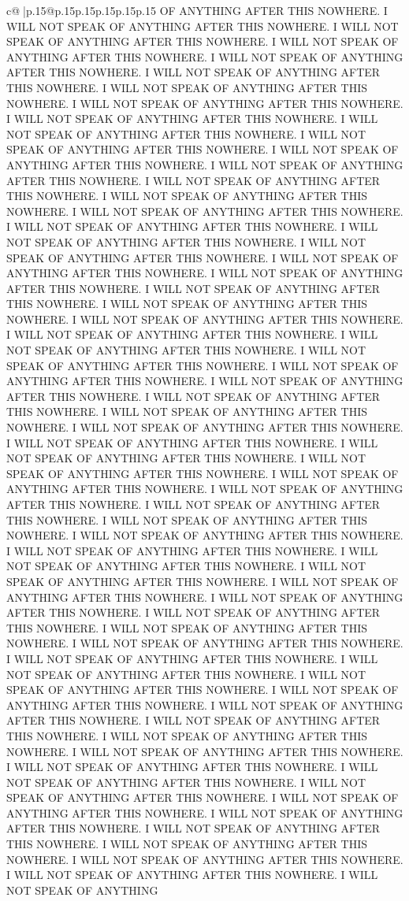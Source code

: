 \documentclass{article}
\begin{document}
{\begin{supertabular}{c@{$\;$}|p{.15\linewidth}@{}p{.15\linewidth}p{.15\linewidth}p{.15\linewidth}p{.15\linewidth}p{.15\linewidth}}
{{{OF ANYTHING AFTER THIS NOWHERE. I WILL NOT SPEAK OF ANYTHING AFTER THIS NOWHERE. I WILL NOT SPEAK OF ANYTHING AFTER THIS NOWHERE. I WILL NOT SPEAK OF ANYTHING AFTER THIS NOWHERE. I WILL NOT SPEAK OF ANYTHING AFTER THIS NOWHERE. I WILL NOT SPEAK OF ANYTHING AFTER THIS NOWHERE. I WILL NOT SPEAK OF ANYTHING AFTER THIS NOWHERE. I WILL NOT SPEAK OF ANYTHING AFTER THIS NOWHERE. I WILL NOT SPEAK OF ANYTHING AFTER THIS NOWHERE. I WILL NOT SPEAK OF ANYTHING AFTER THIS NOWHERE. I WILL NOT SPEAK OF ANYTHING AFTER THIS NOWHERE. I WILL NOT SPEAK OF ANYTHING AFTER THIS NOWHERE. I WILL NOT SPEAK OF ANYTHING AFTER THIS NOWHERE. I WILL NOT SPEAK OF ANYTHING AFTER THIS NOWHERE. I WILL NOT SPEAK OF ANYTHING AFTER THIS NOWHERE. I WILL NOT SPEAK OF ANYTHING AFTER THIS NOWHERE. I WILL NOT SPEAK OF ANYTHING AFTER THIS NOWHERE. I WILL NOT SPEAK OF ANYTHING AFTER THIS NOWHERE. I WILL NOT SPEAK OF ANYTHING AFTER THIS NOWHERE. I WILL NOT SPEAK OF ANYTHING AFTER THIS NOWHERE. I WILL NOT SPEAK OF ANYTHING AFTER THIS NOWHERE. I WILL NOT SPEAK OF ANYTHING AFTER THIS NOWHERE. I WILL NOT SPEAK OF ANYTHING AFTER THIS NOWHERE. I WILL NOT SPEAK OF ANYTHING AFTER THIS NOWHERE. I WILL NOT SPEAK OF ANYTHING AFTER THIS NOWHERE. I WILL NOT SPEAK OF ANYTHING AFTER THIS NOWHERE. I WILL NOT SPEAK OF ANYTHING AFTER THIS NOWHERE. I WILL NOT SPEAK OF ANYTHING AFTER THIS NOWHERE. I WILL NOT SPEAK OF ANYTHING AFTER THIS NOWHERE. I WILL NOT SPEAK OF ANYTHING AFTER THIS NOWHERE. I WILL NOT SPEAK OF ANYTHING AFTER THIS NOWHERE. I WILL NOT SPEAK OF ANYTHING AFTER THIS NOWHERE. I WILL NOT SPEAK OF ANYTHING AFTER THIS NOWHERE. I WILL NOT SPEAK OF ANYTHING AFTER THIS NOWHERE. I WILL NOT SPEAK OF ANYTHING AFTER THIS NOWHERE. I WILL NOT SPEAK OF ANYTHING AFTER THIS NOWHERE. I WILL NOT SPEAK OF ANYTHING AFTER THIS NOWHERE. I WILL NOT SPEAK OF ANYTHING AFTER THIS NOWHERE. I WILL NOT SPEAK OF ANYTHING AFTER THIS NOWHERE. I WILL NOT SPEAK OF ANYTHING AFTER THIS NOWHERE. I WILL NOT SPEAK OF ANYTHING AFTER THIS NOWHERE. I WILL NOT SPEAK OF ANYTHING AFTER THIS NOWHERE. I WILL NOT SPEAK OF ANYTHING AFTER THIS NOWHERE. I WILL NOT SPEAK OF ANYTHING AFTER THIS NOWHERE. I WILL NOT SPEAK OF ANYTHING AFTER THIS NOWHERE. I WILL NOT SPEAK OF ANYTHING AFTER THIS NOWHERE. I WILL NOT SPEAK OF ANYTHING AFTER THIS NOWHERE. I WILL NOT SPEAK OF ANYTHING AFTER THIS NOWHERE. I WILL NOT SPEAK OF ANYTHING AFTER THIS NOWHERE. I WILL NOT SPEAK OF ANYTHING AFTER THIS NOWHERE. I WILL NOT SPEAK OF ANYTHING AFTER THIS NOWHERE. I WILL NOT SPEAK OF ANYTHING AFTER THIS NOWHERE. I WILL NOT SPEAK OF ANYTHING AFTER THIS NOWHERE. I WILL NOT SPEAK OF ANYTHING AFTER THIS NOWHERE. I WILL NOT SPEAK OF ANYTHING AFTER THIS NOWHERE. I WILL NOT SPEAK OF ANYTHING AFTER THIS NOWHERE. I WILL NOT SPEAK OF ANYTHING AFTER THIS NOWHERE. I WILL NOT SPEAK OF ANYTHING AFTER THIS NOWHERE. I WILL NOT SPEAK OF ANYTHING AFTER THIS NOWHERE. I WILL NOT SPEAK OF ANYTHING AFTER THIS NOWHERE. I WILL NOT SPEAK OF ANYTHING AFTER THIS NOWHERE. I WILL NOT SPEAK OF ANYTHING AFTER THIS NOWHERE. I WILL NOT SPEAK OF ANYTHING AFTER THIS NOWHERE. I WILL NOT SPEAK OF ANYTHING AFTER THIS NOWHERE. I WILL NOT SPEAK OF ANYTHING AFTER THIS NOWHERE. I WILL NOT SPEAK OF ANYTHING }}}
\end{supertabular}}
\end{document}
